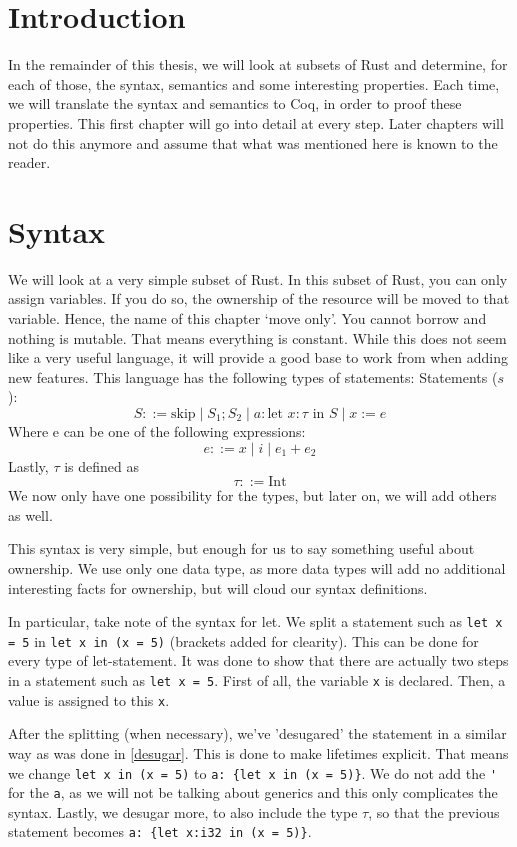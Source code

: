 \section{Introduction}
In the remainder of this thesis, we will look at subsets of Rust and determine, for each of those, the syntax, semantics and some interesting properties. Each time, we will translate the syntax and semantics to Coq, in order to proof these properties. This first chapter will go into detail at every step. Later chapters will not do this anymore and assume that what was mentioned here is known to the reader. 

\section{Syntax}
We will look at a very simple subset of Rust. In this subset of Rust, you can only assign variables. If you do so, the ownership of the resource will be moved to that variable. Hence, the name of this chapter `move only'. 
You cannot borrow and nothing is mutable. That means everything is constant. While this does not seem like a very useful language, it will provide a good base to work from when adding new features. This language has the following types of statements:
Statements ($s$):
$$S ::= \textrm{skip} \mid S_1; S_2 \mid a: \textrm{let } x:\tau \textrm{ in } S \mid x := e$$
Where e can be one of the following expressions:
$$e ::= x \mid i \mid e_1 + e_2$$
Lastly, $\tau$ is defined as 
$$\tau ::= \textrm{Int}$$
We now only have one possibility for the types, but later on, we will add others as well.

This syntax is very simple, but enough for us to say something useful about ownership. We use only one data type, as more data types will add no additional interesting facts for ownership, but will cloud our syntax definitions. 

In particular, take note of the syntax for let. We split a statement such as \verb|let x = 5| in \verb|let x in (x = 5)| (brackets added for clearity). This can be done for every type of let-statement. It was done to show that there are actually two steps in a statement such as \verb|let x = 5|. First of all, the variable \verb|x| is declared. Then, a value is assigned to this \verb|x|. 

After the splitting (when necessary), we've 'desugared' the statement in a similar way as was done in \ref{desugar}. This is done to make lifetimes explicit. That means we change \verb|let x in (x = 5)| to \verb|a: {let x in (x = 5)}|. We do not add the \verb|'| for the \verb|a|, as we will not be talking about generics and this only complicates the syntax. Lastly, we desugar more, to also include the type $\tau$, so that the previous statement becomes \verb|a: {let x:i32 in (x = 5)}|. 

